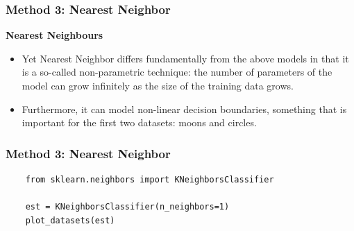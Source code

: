 \documentclass[MASTER.tex]{subfiles}
\begin{document}
\begin{frame}
		\frametitle{Method 3: Nearest Neighbor}
		\Large
	\textbf{Nearest Neighbours}
	\begin{itemize}
\item 	Yet Nearest Neighbor differs fundamentally from the above models in that it is a so-called non-parametric technique: the number of parameters of the model can grow infinitely as the size of the training data grows. 
\item Furthermore, it can model non-linear decision boundaries, something that is important for the first two datasets: moons and circles.
	\end{itemize}



\end{frame}

\begin{frame}[fragile]
	\frametitle{Method 3: Nearest Neighbor}
	\large
	\begin{framed}
		\begin{verbatim}
	from sklearn.neighbors import KNeighborsClassifier
	
	est = KNeighborsClassifier(n_neighbors=1)
	plot_datasets(est)
		\end{verbatim}
	\end{framed}
\end{frame}
\end{document}
